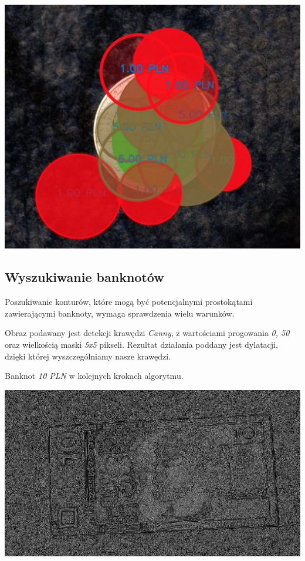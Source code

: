 \documentclass{mwart}
\begin{document}
\begin{center}
    \includegraphics[width=\textwidth]{Objects.png}
\end{center}

\subsection{Wyszukiwanie banknotów}
Poszukiwanie konturów, które mogą być potencjalnymi prostokątami zawierającymi banknoty, wymaga sprawdzenia wielu warunków. 

Obraz podawany jest detekcji krawędzi \textit{Canny}, z wartościami progowania \textit{0, 50} oraz wielkością maski \textit{5x5} pikseli. Rezultat działania poddany jest dylatacji, dzięki której wyszczególniamy nasze krawędzi. 


Banknot \textit{10 PLN} w kolejnych krokach algorytmu.
\begin{center}
    \includegraphics[width=\textwidth]{Gray_10_before.png}
\end{center}
\end{document}
